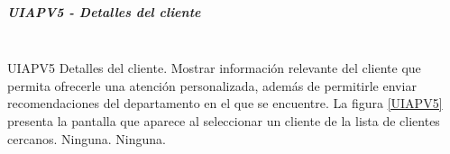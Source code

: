 \subparagraph{UIAPV5 - Detalles del cliente} ~\\

{UIAPV5} %
{Detalles del cliente.}  %
{Mostrar información relevante del cliente que permita ofrecerle una atención personalizada, además de permitirle enviar recomendaciones del departamento en el que se encuentre.} %
{La figura \ref{UIAPV5} presenta la pantalla que aparece al seleccionar un cliente de la lista de clientes cercanos.} %
{Ninguna.} %
{Ninguna.} %


